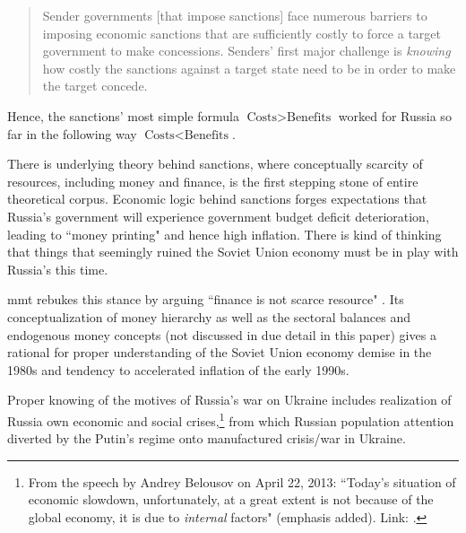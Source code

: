 \begin{quote}
Sender governments [that impose sanctions] face numerous barriers to
imposing economic sanctions that are sufficiently costly to force a
target government to make concessions. Senders' first major challenge
is \textit{knowing} how costly the sanctions against a target state need to
be in order to make the target concede.~\citep[p.~169, emphasis added]{sanctions2021}
\end{quote}

Hence, the sanctions' most simple formula $\text{Costs}>\text{Benefits}$ worked for
Russia so far in the following way $\text{Costs}<\text{Benefits}$.

There is underlying theory behind sanctions, where conceptually scarcity
of resources, including money and finance, is the first stepping stone
of entire theoretical corpus. Economic logic behind sanctions forges
expectations that Russia's government will experience government budget
deficit deterioration, leading to ``money printing" and hence high
inflation. There is kind of thinking that things that seemingly ruined
the Soviet Union economy must be in play with Russia's this time.

\ac{mmt} rebukes this stance by arguing ``finance is not scarce resource"
\citep[p.~139]{wray2020}. Its conceptualization of money hierarchy as well as
the sectoral balances and endogenous money concepts (not discussed in
due detail in this paper) gives a rational for proper understanding of
the Soviet Union economy demise in the 1980s and tendency to accelerated
inflation of the early 1990s.

Proper knowing of the motives of Russia's war on Ukraine includes
realization of Russia own economic and social crises,\footnote{From the speech by Andrey Belousov on April 22, 2013: ``Today's situation of economic slowdown, unfortunately, at a great extent is not because of the global economy, it is due to \textit{internal} factors"
(emphasis added). Link: \url{}.} from which Russian population attention diverted by the Putin's regime onto manufactured crisis/war in Ukraine.
